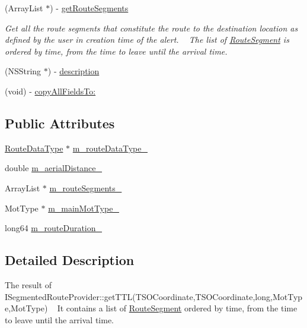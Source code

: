\begin{DoxyCompactItemize}
(Array\+List $\ast$) -\/ \hyperlink{interface_a_route_data_a27bdae817cfaf2c3eb4bc9db83407f11}{get\+Route\+Segments}
\begin{DoxyCompactList}\small\item\em Get all the route segments that constitute the route to the destination location as defined by the user in creation time of the alert. ~\newline
 The list of \hyperlink{interface_route_segment}{Route\+Segment} is ordered by time, from the time to leave until the arrival time.~\newline
 \end{DoxyCompactList}\item 
(N\+S\+String $\ast$) -\/ \hyperlink{interface_a_route_data_aaa6ed0427be252c3dd4c213f3fa535c1}{description}
\item 
(void) -\/ \hyperlink{interface_a_route_data_a9ad9c2e6b5669672b68bf053ca883c3a}{copy\+All\+Fields\+To\+:}
\end{DoxyCompactItemize}
\subsection*{Public Attributes}
\begin{DoxyCompactItemize}
\item 
\hyperlink{interface_route_data_type}{Route\+Data\+Type} $\ast$ \hyperlink{interface_a_route_data_ac67dd664469f96eef6892486da7a80d5}{m\+\_\+route\+Data\+Type\+\_\+}
\item 
double \hyperlink{interface_a_route_data_acff13e58629eac25965dbe1c1f13c131}{m\+\_\+aerial\+Distance\+\_\+}
\item 
Array\+List $\ast$ \hyperlink{interface_a_route_data_a5e80a8c6042bc60e66ef4c2c136e0f43}{m\+\_\+route\+Segments\+\_\+}
\item 
Mot\+Type $\ast$ \hyperlink{interface_a_route_data_ab09074b4f92fa23a20ef081a90e426bb}{m\+\_\+main\+Mot\+Type\+\_\+}
\item 
long64 \hyperlink{interface_a_route_data_aa612b37466c55d5f97a401495ea7ef7f}{m\+\_\+route\+Duration\+\_\+}
\end{DoxyCompactItemize}


\subsection{Detailed Description}
The result of I\+Segmented\+Route\+Provider\+::get\+T\+T\+L(\+T\+S\+O\+Coordinate,\+T\+S\+O\+Coordinate,long,\+Mot\+Type,\+Mot\+Type) ~\newline
 It contains a list of \hyperlink{interface_route_segment}{Route\+Segment} ordered by time, from the time to leave until the arrival time. 

